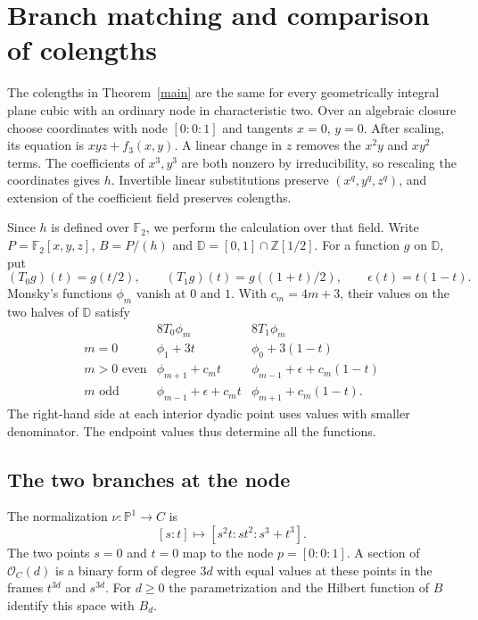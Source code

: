 \documentclass[11pt,a4paper,reqno]{amsart}
\numberwithin{equation}{section}
\theoremstyle{plain}
\newcommand{\OO}{\mathcal O}
\newcommand{\PP}{\mathbb P}
\begin{document}
\section{Branch matching and comparison of colengths}\label{sec:cubic}

The colengths in Theorem~\ref{main} are the same for every geometrically integral plane cubic with an ordinary node in characteristic two. Over an algebraic closure choose coordinates with node $[0:0:1]$ and tangents $x=0$, $y=0$. After scaling, its equation is $xyz+f_3(x,y)$. A linear change in $z$ removes the $x^2y$ and $xy^2$ terms. The coefficients of $x^3,y^3$ are both nonzero by irreducibility, so rescaling the coordinates gives $h$. Invertible linear substitutions preserve $(x^q,y^q,z^q)$, and extension of the coefficient field preserves colengths.

Since $h$ is defined over $\mathbb F_2$, we perform the calculation over that field. Write $P=\mathbb F_2[x,y,z]$, $B=P/(h)$ and $\mathbb D=[0,1]\cap\mathbb Z[1/2]$. For a function $g$ on $\mathbb D$, put
\[
 (T_0g)(t)=g(t/2),\qquad (T_1g)(t)=g((1+t)/2),\qquad \epsilon(t)=t(1-t).
\]
Monsky's functions $\phi_m$ vanish at $0$ and $1$. With $c_m=4m+3$, their values on the two halves of $\mathbb D$ satisfy
\begin{equation}\label{rules}
\begin{array}{c|cc}
 &8T_0\phi_m&8T_1\phi_m\\ \hline
 m=0&\phi_1+3t&\phi_0+3(1-t)\\
 m>0\text{ even}&\phi_{m+1}+c_m t&\phi_{m-1}+\epsilon+c_m(1-t)\\
 m\text{ odd}&\phi_{m-1}+\epsilon+c_m t&\phi_{m+1}+c_m(1-t).
\end{array}
\end{equation}
The right-hand side at each interior dyadic point uses values with smaller denominator. The endpoint values thus determine all the functions.

\subsection{The two branches at the node}\label{sec:node}

The normalization $\nu:\PP^1\to C$ is
\[
 [s:t]\longmapsto[s^2t:st^2:s^3+t^3].
\]
The two points $s=0$ and $t=0$ map to the node $p=[0:0:1]$. A section of $\OO_C(d)$ is a binary form of degree $3d$ with equal values at these points in the frames $t^{3d}$ and $s^{3d}$. For $d\ge0$ the parametrization and the Hilbert function of $B$ identify this space with $B_d$.
\end{document}
